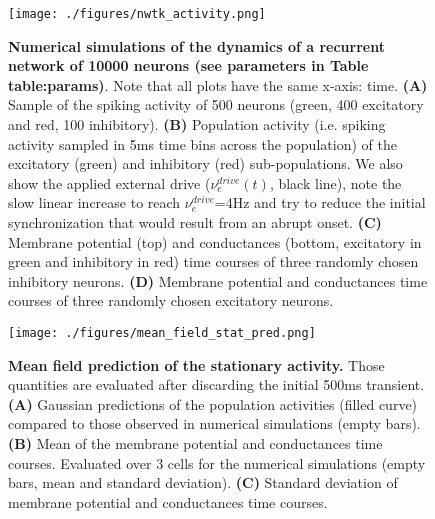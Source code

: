 \documentclass[8pt, colorlinks, a4paper]{article}
\renewcommand\ref{}
\begin{document}

\begin{figure}[tb!]
\centering
\texttt{[image: ./figures/nwtk\_activity.png]}
\caption{\label{fig:ntwk-act}\textbf{Numerical simulations of the
    dynamics of a recurrent network of 10000 neurons (see parameters
    in Table \ref{table:params})}. Note that all plots have the same
  x-axis: time. \textbf{(A)} Sample of the spiking activity of 500
  neurons (green, 400 excitatory and red, 100
  inhibitory). \textbf{(B)} Population activity (i.e. spiking activity
  sampled in 5ms time bins across the population) of the excitatory
  (green) and inhibitory (red) sub-populations. We also show the
  applied external drive (\(\nu_e^{drive}(t)\), black line), note the
  slow linear increase to reach \(\nu_e^{drive}\)=4Hz and try to
  reduce the initial synchronization that would result from an abrupt
  onset. \textbf{(C)} Membrane potential (top) and conductances
  (bottom, excitatory in green and inhibitory in red) time courses of
  three randomly chosen inhibitory neurons. \textbf{(D)} Membrane
  potential and conductances time courses of three randomly chosen
  excitatory neurons.}
\end{figure}

\begin{figure}[tb!]
\centering
\texttt{[image: ./figures/mean\_field\_stat\_pred.png]}
\caption{\label{fig:mf-stat-pred}\textbf{Mean field prediction of the
    stationary activity.} Those quantities are evaluated after
  discarding the initial 500ms transient. \textbf{(A)} Gaussian
  predictions of the population activities (filled curve) compared to
  those observed in numerical simulations (empty bars). \textbf{(B)}
  Mean of the membrane potential and conductances time
  courses. Evaluated over 3 cells for the numerical simulations (empty
  bars, mean and standard deviation). \textbf{(C)} Standard deviation
  of membrane potential and conductances time courses.}
\end{figure}
\end{document}
